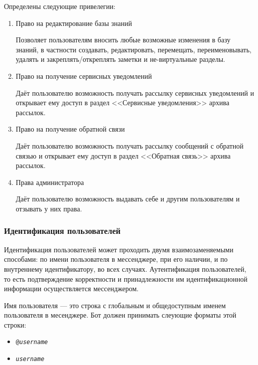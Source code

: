     Определены следующие привелегии:
    \begin{enumerate}
        \item \label{itm:req:sec:privs:kbedit}
            Право на редактирование базы знаний

            Позволяет пользователям вносить любые возможные изменения в базу знаний,
            в частности создавать, редактировать, перемещать, переименовывать, удалять
            и закреплять/откреплять заметки и не-виртуальные разделы.

        \item \label{itm:req:sec:privs:service}
            Право на получение сервисных уведомлений

            Даёт пользователю возможность получать рассылку сервисных уведомлений и открывает ему доступ
            в раздел <<Сервисные уведомления>> архива рассылок.

        \item \label{itm:req:sec:privs:feedback}
            Право на получение обратной связи

            Даёт пользователю возможность получать рассылку сообщений с обратной связью и
            открывает ему доступ в раздел <<Обратная связь>> архива рассылок.

        \item \label{itm:req:sec:privs:admin}
            Права администратора

            Даёт пользователю возможность выдавать себе и другим пользователям и
            отзывать у них права.
    \end{enumerate}

\subsubsection{Идентификация пользователей}
    \label{sec:req:sec:id}
    Идентификация пользователей может проходить двумя взаимозаменяемыми способами:
    по имени пользователя в мессенджере, при его наличии, и по внутреннему идентификатору,
    во всех случаях. Аутентификация пользователей, то есть подтверждение корректности и
    принадлежности им идентификационной информации осуществляется мессенджером.

    Имя пользователя --- это строка с глобальным и общедоступным именем пользователя в месенджере.
    Бот должен принимать слеующие форматы этой строки:
    \begin{itemize}
        \item
            \texttt{@\textit{username}}
        \item
            \texttt{\textit{username}}
    \end{itemize}
    

